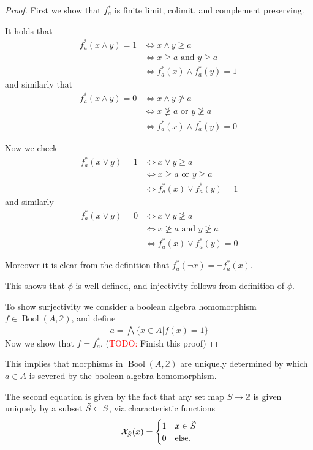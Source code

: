 \documentclass[12pt,a4paper]{article}
\DeclareMathOperator{\Bool}{Bool}
\def\t{\ensuremath\tilde}
\begin{document}
 \begin{proof}
 	First we show that $f^*_a$ is finite limit, colimit, and complement preserving.
 
 It holds that \begin{align*}
 	f^*_a(x \wedge y) = 1 &\iff x \wedge y \geq a\\ &\iff x \geq a \text{ and } y \geq a\\ &\iff f^*_a(x) \wedge f^*_a(y) =1 \
 \end{align*}
 and similarly that \begin{align*}
 	f^*_a(x \wedge y) = 0 &\iff x \wedge y \ngeq a\\ &\iff x \ngeq a \text{ or } y \ngeq a\\ &\iff f^*_a(x)  \wedge f^*_a(y) =0 \
 \end{align*}


Now we check \begin{align*}
	f^*_a( x \vee y) = 1 &\iff x \vee y \geq a\\ &\iff x \geq a \text{ or } y \geq a\\
	&\iff f^*_a(x) \vee f^*_a(y) = 1
\end{align*}
and similarly \begin{align*}
	f^*_a( x \vee y) = 0 &\iff x \vee y \ngeq a\\ &\iff x \ngeq a \text{ and } y \ngeq a\\
	&\iff f^*_a(x) \vee f^*_a(y) = 0
\end{align*}

Moreover it is clear from the definition that $f^*_a(\neg x)  =  \neg f^*_a(x)$.

This shows that $\phi$ is well defined, and injectivity follows from definition of $\phi$. 

To show surjectivity we consider a boolean algebra homomorphism $f \in \Bool(A, \mathbb{2})$, and define \begin{align*}
	a = \bigwedge \{ x \in A \lvert f(x) = 1\}
\end{align*}
Now we show that $ f = f^*_a$. 
(\textcolor{red}{TODO:} Finish this proof)
 \end{proof}
 This implies that morphisms in $\Bool(A, \mathbb{2})$ are uniquely determined by which $a \in A$ is severed by the boolean algebra homomorphism.

The second equation is given by the fact that any set map  $S \to \mathbb{2}$ is given uniquely by a subset $\t S \subset S$, via characteristic functions \begin{equation*}
  \mathcal{X}_{\t S}(x) = \begin{cases}
   1 & x \in \t S \\
    0 & \text{else}.
  \end{cases}
\end{equation*}
\end{document}
